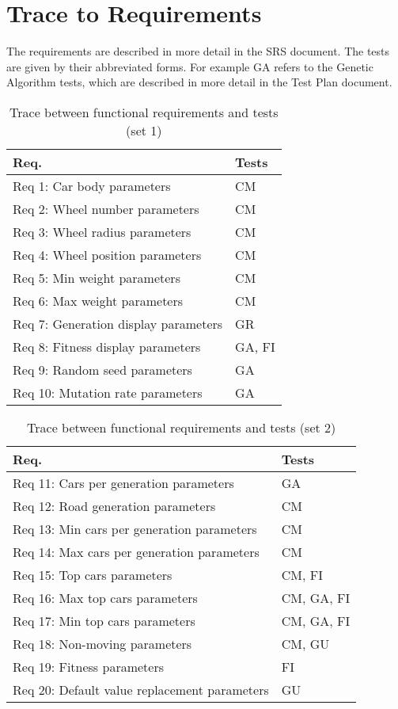\documentclass[12pt, titlepage]{article}
\begin{document}
\section{Trace to Requirements}

The requirements are described in more detail in the SRS document. The tests are 
given by their abbreviated forms. For example GA refers to the Genetic Algorithm 
tests, which are described in more detail in the Test Plan document.
		
\begin{table}[H]
\centering
\begin{tabular}{p{} p{}}
\toprule
\textbf{Req.} & \textbf{Tests}\\
\midrule
Req 1: Car body parameters & CM \\
Req 2: Wheel number parameters & CM \\
Req 3: Wheel radius parameters & CM\\
Req 4: Wheel position parameters & CM\\
Req 5: Min weight parameters & CM\\
Req 6: Max weight parameters & CM\\
Req 7: Generation display parameters & GR\\
Req 8: Fitness display parameters & GA, FI\\
Req 9: Random seed parameters & GA\\
Req 10: Mutation rate parameters & GA\\
\bottomrule
\end{tabular}
\caption{Trace between functional requirements and tests (set 1)}
\label{TblRT}
\end{table}

\begin{table}[H]
\centering
\begin{tabular}{p{} p{}}
\toprule
\textbf{Req.} & \textbf{Tests}\\
\midrule
Req 11: Cars per generation parameters  & GA\\
Req 12: Road generation parameters & CM\\
Req 13: Min cars per generation parameters & CM\\
Req 14: Max cars per generation parameters & CM\\
Req 15: Top cars parameters & CM, FI\\
Req 16: Max top cars parameters & CM, GA, FI\\
Req 17: Min top cars parameters & CM, GA, FI\\
Req 18: Non-moving parameters & CM, GU\\
Req 19: Fitness parameters & FI\\
Req 20: Default value replacement parameters & GU\\
\bottomrule
\end{tabular}
\caption{Trace between functional requirements and tests (set 2)}
\label{TblRT2}
\end{table}
\end{document}
